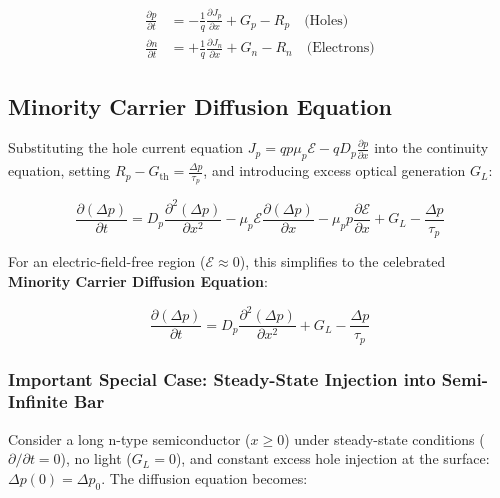 \documentclass[12pt,a4paper]{article}
\begin{document}
\begin{tcolorbox}[formulabox, title={\textbf{General One-Dimensional Continuity Equations}}]
\begin{align}
  \frac{\partial p}{\partial t} &= -\frac{1}{q} \frac{\partial J_p}{\partial x} + G_p - R_p \quad \text{(Holes)} \\
  \frac{\partial n}{\partial t} &= +\frac{1}{q} \frac{\partial J_n}{\partial x} + G_n - R_n \quad \text{(Electrons)}
\end{align}
\end{tcolorbox}

\subsection{Minority Carrier Diffusion Equation}
Substituting the hole current equation $J_p = q p \mu_p \mathcal{E} - q D_p \frac{\partial p}{\partial x}$ into the continuity equation, setting $R_p - G_{\text{th}} = \frac{\Delta p}{\tau_p}$, and introducing excess optical generation $G_L$:

\begin{equation}
  \frac{\partial (\Delta p)}{\partial t} = D_p \frac{\partial^2 (\Delta p)}{\partial x^2} - \mu_p \mathcal{E} \frac{\partial (\Delta p)}{\partial x} - \mu_p p \frac{\partial \mathcal{E}}{\partial x} + G_L - \frac{\Delta p}{\tau_p}
\end{equation}

For an electric-field-free region ($\mathcal{E} \approx 0$), this simplifies to the celebrated \textbf{Minority Carrier Diffusion Equation}:

\begin{tcolorbox}[formulabox, title={\textbf{Minority Carrier Diffusion Equation (Field-Free Region)}}]
\begin{equation}
  \frac{\partial (\Delta p)}{\partial t} = D_p \frac{\partial^2 (\Delta p)}{\partial x^2} + G_L - \frac{\Delta p}{\tau_p}
\end{equation}
\end{tcolorbox}

\subsubsection{Important Special Case: Steady-State Injection into Semi-Infinite Bar}
Consider a long n-type semiconductor ($x \ge 0$) under steady-state conditions ($\partial/\partial t = 0$), no light ($G_L = 0$), and constant excess hole injection at the surface: $\Delta p(0) = \Delta p_0$. The diffusion equation becomes:
\end{document}
